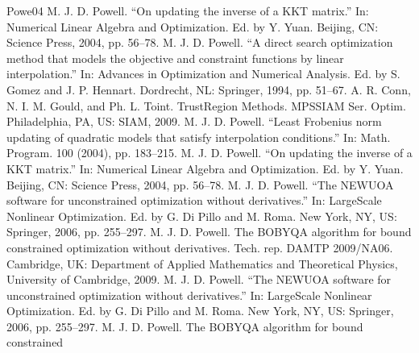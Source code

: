 \documentclass[letterpaper,10pt,english]{sphinxmanual}
\begin{document}
\begin{sphinxthebibliography}{Powe04}
\sphinxAtStartPar
M. J. D. Powell. “On updating the inverse of a KKT matrix.”
In: Numerical Linear Algebra and Optimization. Ed. by Y. Yuan.
Beijing, CN: Science Press, 2004, pp. 56–78.
\sphinxAtStartPar
M. J. D. Powell. “A direct search optimization method that
models the objective and constraint functions by linear
interpolation.” In: Advances in Optimization and Numerical Analysis.
Ed. by S. Gomez and J. P. Hennart. Dordrecht, NL: Springer, 1994, pp.
51–67.
\sphinxAtStartPar
A. R. Conn, N. I. M. Gould, and Ph. L. Toint. Trust\sphinxhyphen{}Region
Methods. MPS\sphinxhyphen{}SIAM Ser. Optim. Philadelphia, PA, US: SIAM, 2009.
\sphinxAtStartPar
M. J. D. Powell. “Least Frobenius norm updating of quadratic
models that satisfy interpolation conditions.” In: Math. Program. 100
(2004), pp. 183–215.
\sphinxAtStartPar
M. J. D. Powell. “On updating the inverse of a KKT matrix.”
In: Numerical Linear Algebra and Optimization. Ed. by Y. Yuan.
Beijing, CN: Science Press, 2004, pp. 56–78.
\sphinxAtStartPar
M. J. D. Powell. “The NEWUOA software for unconstrained
optimization without derivatives.” In: Large\sphinxhyphen{}Scale Nonlinear
Optimization. Ed. by G. Di Pillo and M. Roma. New York, NY, US: Springer,
2006, pp. 255–297.
\sphinxAtStartPar
M. J. D. Powell. The BOBYQA algorithm for bound constrained
optimization without derivatives. Tech. rep. DAMTP 2009/NA06. Cambridge,
UK: Department of Applied Mathematics and Theoretical Physics, University
of Cambridge, 2009.
\sphinxAtStartPar
M. J. D. Powell. “The NEWUOA software for unconstrained
optimization without derivatives.” In: Large\sphinxhyphen{}Scale Nonlinear
Optimization. Ed. by G. Di Pillo and M. Roma. New York, NY, US: Springer,
2006, pp. 255\sphinxhyphen{}–297.
\sphinxAtStartPar
M. J. D. Powell. The BOBYQA algorithm for bound constrained

\end{sphinxthebibliography}
\end{document}
